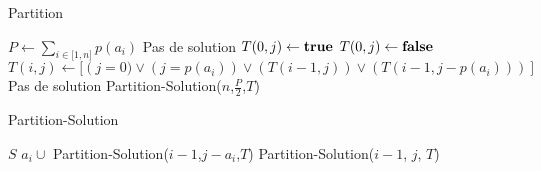 \begin{algorithm}[H]
	\caption{Partition}
	\label{algo_dyn_partition}
	\begin{algorithmic}[1]
		\STATE $P \leftarrow \sum_{i \in \mathbb{[}1, n \mathbb{]}} p(a_i)$
			\RETURN Pas de solution
		\ELSE
					\STATE $T(0, j) \leftarrow \textbf{true}{}$
				\ELSE
					\STATE $T(0, j) \leftarrow \textbf{false}{}$
				\ENDIF
			\ENDFOR
					\STATE $T(i, j) \leftarrow [\left (j = 0) \vee (j = p(a_i)) \vee (T(i-1, j)) \vee (T(i-1, j-p(a_i))) \right]$
				\ENDFOR
			\ENDFOR
				\RETURN Pas de solution
			\ELSE
				\RETURN Partition-Solution($n$,$\frac{P}{2}$,$T$)
			\ENDIF
		\ENDIF
	\end{algorithmic}
\end{algorithm}

\begin{algorithm}
	\caption{Partition-Solution}
	\label{recsol}
	\begin{algorithmic}[1]
	\REQUIRE
			\RETURN $S$
		\ELSE
				\RETURN $a_i \cup$ Partition-Solution($i-1$,$j-a_i$,$T$)
			\ELSE
				\RETURN Partition-Solution($i-1$, $j$, $T$)
			\ENDIF
		\ENDIF
	\end{algorithmic}
\end{algorithm}

